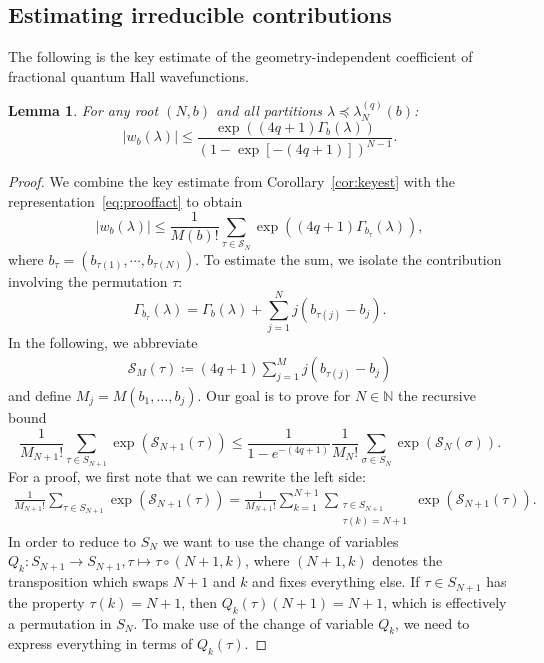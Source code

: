 \documentclass[letterpaper, DIV=17]{scrartcl}
\newtheorem{lemma}[theorem]{Lemma}
\numberwithin{equation}{section}
\theoremstyle{definition}
\begin{document}
\subsection{Estimating irreducible contributions}

The following is the key estimate of the geometry-independent coefficient of fractional quantum Hall wavefunctions. 
\begin{lemma}
	For any root $ (N,b) $ and all partitions $ \lambda\preceq \lambda^{(q)}_N(b)$:
	\begin{equation}\label{eq:wbest}
		\left| w_b(\lambda) \right| \leq \frac{ \exp\left( (4q+1) \Gamma_b( \lambda) \right) }{\left(1- \exp\left[-(4q+1)\right] \right)^{N-1}} . 
	\end{equation}
\end{lemma}
\begin{proof}
	We combine the key estimate from Corollary~\ref{cor:keyest} with the representation~\eqref{eq:prooffact} to obtain
	\begin{equation}
		\left| w_b(\lambda) \right| \leq  \frac{1}{M(b)!} \sum_{\tau \in  \mathcal{S}_{N}} 
		\exp\left( (4q+1) \Gamma_{b_\tau}(\lambda) \right) ,
	\end{equation}
	where $b_\tau  = (b_{\tau(1)} , \cdots , b_{\tau(N)}) $. To estimate the sum, we isolate the contribution involving the permutation $ \tau $:
	$$
	\Gamma_{b_\tau}(\lambda ) =  \Gamma_b(\lambda) + \sum_{j=1}^N j \left( b_{\tau(j)} - b_j \right) .
	$$
	In the following, we abbreviate
	\begin{align*}
		\mathcal{S}_M(\tau) \coloneqq (4q+1)\sum_{j=1}^{M} j (b_{\tau(j)}-b_j)
	\end{align*}
	and define $M_j = M(b_1, \dots, b_j)$. Our goal is to prove for $ N \in \mathbb{N} $ the recursive bound 
	\begin{equation} \label{recursion}
		\frac{1}{M_{N+1}!} \sum_{\tau\in S_{N+1}} \exp\left(\mathcal{S}_{N+1}(\tau)\right) 
		\leq \frac{1}{1-e^{-(4q+1)}} \frac{1}{M_{N}!} \sum_{\sigma\in S_N} \exp\left(\mathcal{S}_N(\sigma)\right).
	\end{equation}
	For a proof, we first note that we can rewrite the left side:
	\begin{align*}
		\frac{1}{M_{N+1}!} \sum_{\tau\in S_{N+1}} \exp\left(\mathcal{S}_{N+1}(\tau)\right) 
		= 	\frac{1}{M_{N+1}!} \sum_{k=1}^{N+1} \sum_{\substack{\tau\in S_{N+1} \\ \tau(k)=N+1}} \exp\left(\mathcal{S}_{N+1}(\tau)\right).
	\end{align*}
	In order to reduce to $S_N$ we want to use the change of variables $Q_k: S_{N+1} \rightarrow S_{N+1}, \tau \mapsto \tau \circ (N+1,k)$, where $(N+1,k)$ denotes the transposition which swaps $N+1$ and $k$ and fixes everything else. If  $\tau\in S_{N+1}$ has the property $\tau(k)=N+1$, then $Q_k(\tau)(N+1)=N+1$, which is effectively a permutation in $S_N$. To make use of the change of variable $Q_k$, we need to express everything in terms of $Q_k(\tau)$. 


\end{proof}
\end{document}
